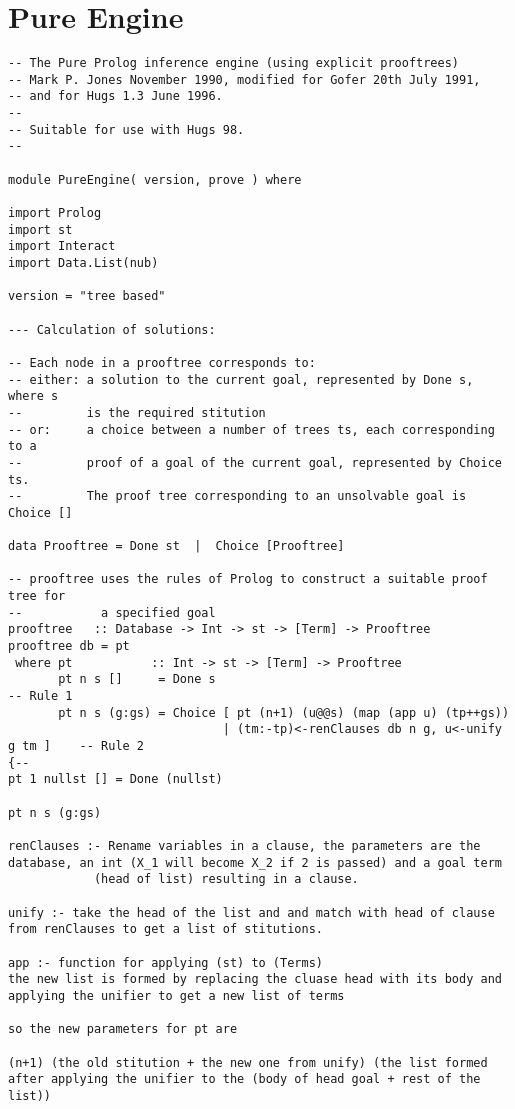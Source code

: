 \documentclass[thesis-solanki.tex]{files}
\begin{document}
\section{Pure Engine}
\begin{verbatim}
-- The Pure Prolog inference engine (using explicit prooftrees)
-- Mark P. Jones November 1990, modified for Gofer 20th July 1991,
-- and for Hugs 1.3 June 1996.
--
-- Suitable for use with Hugs 98.
--

module PureEngine( version, prove ) where

import Prolog
import st
import Interact
import Data.List(nub)

version = "tree based" 

--- Calculation of solutions:

-- Each node in a prooftree corresponds to:
-- either: a solution to the current goal, represented by Done s, where s
--         is the required stitution
-- or:     a choice between a number of trees ts, each corresponding to a
--         proof of a goal of the current goal, represented by Choice ts.
--         The proof tree corresponding to an unsolvable goal is Choice [] 

data Prooftree = Done st  |  Choice [Prooftree]

-- prooftree uses the rules of Prolog to construct a suitable proof tree for
--           a specified goal
prooftree   :: Database -> Int -> st -> [Term] -> Prooftree
prooftree db = pt
 where pt           :: Int -> st -> [Term] -> Prooftree
       pt n s []     = Done s 													-- Rule 1
       pt n s (g:gs) = Choice [ pt (n+1) (u@@s) (map (app u) (tp++gs))
                              | (tm:-tp)<-renClauses db n g, u<-unify g tm ]	-- Rule 2
{--
pt 1 nullst [] = Done (nullst)

pt n s (g:gs)

renClauses :- Rename variables in a clause, the parameters are the database, an int (X_1 will become X_2 if 2 is passed) and a goal term 
			(head of list) resulting in a clause.

unify :- take the head of the list and and match with head of clause from renClauses to get a list of stitutions.

app :- function for applying (st) to (Terms)
the new list is formed by replacing the cluase head with its body and applying the unifier to get a new list of terms

so the new parameters for pt are

(n+1) (the old stitution + the new one from unify) (the list formed after applying the unifier to the (body of head goal + rest of the list)) 



\end{verbatim}
\end{document}
